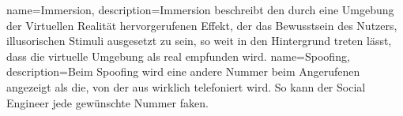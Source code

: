 {
    name={Immersion},
    description={Immersion beschreibt den durch eine Umgebung der Virtuellen Realität hervorgerufenen Effekt, der das Bewusstsein des Nutzers, illusorischen Stimuli ausgesetzt zu sein, so weit in den Hintergrund treten lässt, dass die virtuelle Umgebung als real empfunden wird.\cite{wikiImmersion}}
}
{
    name={Spoofing},
    description={Beim Spoofing wird eine andere Nummer beim Angerufenen angezeigt als die, von der aus wirklich telefoniert wird. So kann der Social Engineer jede gewünschte Nummer faken. \cite{spoofing}}
}


\glsaddall

